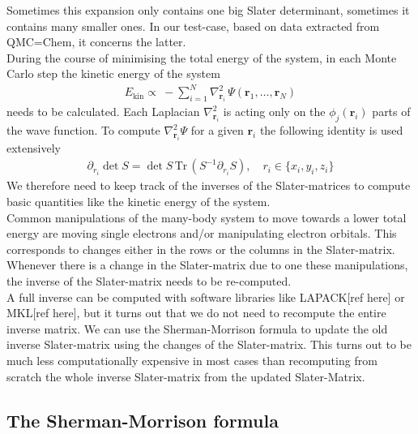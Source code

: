 \documentclass[11pt]{article}
\numberwithin{figure}{section}
\numberwithin{table}{section}
\begin{document}
			Sometimes this expansion only contains one big Slater determinant, sometimes it contains many smaller ones. In our test-case, based on data extracted from QMC=Chem, it concerns the latter.\\
				
			During the course of minimising the total energy of the system, in each Monte Carlo step the kinetic energy of the system
			\begin{align}
				E_\mathrm{kin} \propto\:-\!\sum_{i=1}^{N}\nabla^2_{\mathbf{r}_i}\,\Psi(\mathbf{r}_1,\ldots,\mathbf{r}_N)
			\end{align}
			needs to be calculated. Each Laplacian $\nabla^2_{\mathbf{r}_i}$ is acting only on the $\phi_j(\mathbf{r}_i)$ parts of the wave function. To compute $\nabla^2_{\mathbf{r}_i}\Psi$ for a given $\mathbf{r}_i$ the following identity is used extensively
			\begin{align}
				\partial_{r_i}\det S=\det S\,\mathrm{Tr}\,(S^{-1}\partial_{r_i} S),\quad r_i\in\{x_i,y_i,z_i\}
			\end{align}
			We therefore need to keep track of the inverses of the Slater-matrices to compute basic quantities like the kinetic energy of the system.\\
			
			Common manipulations of the many-body system to move towards a lower total energy are moving single electrons and/or manipulating electron orbitals. This corresponds to changes either in the rows or the columns in the Slater-matrix. Whenever there is a change in the Slater-matrix due to one these manipulations, the inverse of the Slater-matrix needs to be re-computed.\\
			
			A full inverse can be computed with software libraries like LAPACK[ref here] or MKL[ref here], but it turns out that we do not need to recompute the entire inverse matrix. We can use the Sherman-Morrison formula to update the old inverse Slater-matrix using the changes of the Slater-matrix. This turns out to be much less computationally expensive in most cases than recomputing from scratch the whole inverse Slater-matrix from the updated Slater-Matrix.
			
		\subsection{The Sherman-Morrison formula}\label{sec:problem}
			
\end{document}
